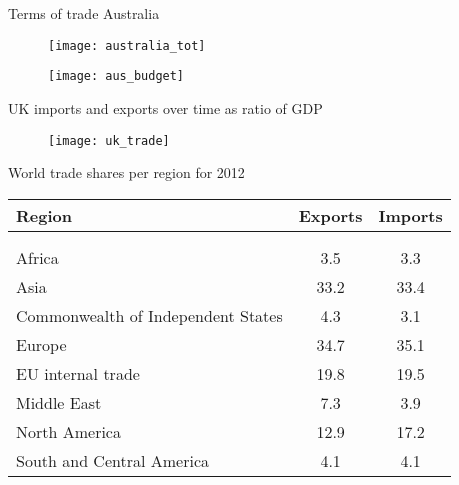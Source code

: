 \documentclass{beamer}
\begin{document}
\begin{frame}{Terms of trade Australia}
  \begin{figure}
    \texttt{[image: australia\_tot]}
  \end{figure}  
\end{frame}


\begin{frame}
  \begin{figure}
    \texttt{[image: aus\_budget]}
  \end{figure}  
\end{frame}

\begin{frame}{UK imports and exports over time as ratio of GDP}
  \begin{figure}
    \texttt{[image: uk\_trade]}
  \end{figure}
  
\end{frame}

\begin{frame}{World trade shares per region for 2012}
  \begin{table}
    \begin{tabular}{lcc}
    Region      & Exports   & Imports\\
    \hline \\[-1.8ex]\\	
    Africa      & 3.5   & 3.3\\
    Asia        & 33.2  & 33.4\\
    Commonwealth of Independent States
                & 4.3   & 3.1\\
    Europe      & 34.7  & 35.1\\
    \hspace{3mm} EU internal trade  
                & 19.8  & 19.5\\
    Middle East & 7.3   & 3.9\\
    North America & 12.9  & 17.2\\
    South and Central America & 4.1 & 4.1\\      
    \end{tabular}
  \end{table}  
\end{frame}
\end{document}
